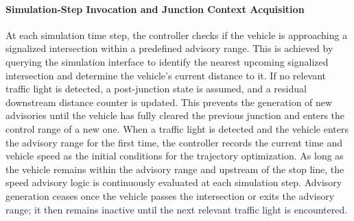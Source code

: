 \paragraph{Simulation‐Step Invocation and Junction Context Acquisition} 
\label{par:Simulation_Step_Invocation}

At each simulation time step, the controller checks if the vehicle is approaching a signalized intersection within a predefined advisory range. This is achieved by querying the simulation interface to identify the nearest upcoming signalized intersection and determine the vehicle’s current distance to it. If no relevant traffic light is detected, a post-junction state is assumed, and a residual downstream distance counter is updated. This prevents the generation of new advisories until the vehicle has fully cleared the previous junction and enters the control range of a new one. 
\mynewline
When a traffic light is detected and the vehicle enters the advisory range for the first time, the controller records the current time and vehicle speed as the initial conditions for the trajectory optimization. As long as the vehicle remains within the advisory range and upstream of the stop line, the speed advisory logic is continuously evaluated at each simulation step. Advisory generation ceases once the vehicle passes the intersection or exits the advisory range; it then remains inactive until the next relevant traffic light is encountered.

